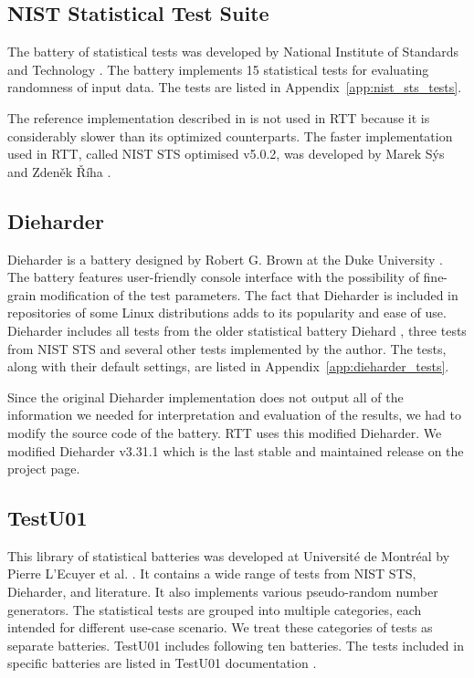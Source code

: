 \documentclass[
	digital,    %
	oneside,
	color,
	11pt,
	nocover,
	notable,
	nolof,
	nolot,
]{fithesis3}
\theoremstyle{definition}
\theoremstyle{remark}
\begin{document}
\subsection{NIST Statistical Test Suite}
The battery of statistical tests was developed by National Institute of Standards and Technology \cite{nist-sts}. The battery implements 15 statistical tests for evaluating randomness of input data. The tests are listed in Appendix~\ref{app:nist_sts_tests}.

The reference implementation described in \cite{nist-sts-documentation} is not used in RTT because it is considerably slower than its optimized counterparts. The faster implementation used in RTT, called NIST STS optimised v5.0.2, was developed by Marek Sýs and Zdeněk Říha \cite{nist-sts-syso-optimization}.

\subsection{Dieharder}
Dieharder is a battery designed by Robert G. Brown at the Duke University \cite{dieharder}. The battery features user-friendly console interface with the possibility of fine-grain modification of the test parameters. The fact that Dieharder is included in repositories of some Linux distributions \cite{dieharder-manpage} adds to its popularity and ease of use. Dieharder includes all tests from the older statistical battery Diehard \cite{diehard}, three tests from NIST STS and several other tests implemented by the author. The tests, along with their default settings, are listed in Appendix~\ref{app:dieharder_tests}.

Since the original Dieharder implementation does not output all of the information we needed for interpretation and evaluation of the results, we had to modify the source code of the battery. RTT uses this modified Dieharder. We modified Dieharder v3.31.1 which is the last stable and maintained release on the project page.

\subsection{TestU01}
This library of statistical batteries was developed at Université de Montréal by Pierre L’Ecuyer et al. \cite{testu01-paper}. It contains a wide range of tests from NIST STS, Dieharder, and literature. It also implements various pseudo-random number generators. The statistical tests are grouped into multiple categories, each intended for different use-case scenario. We treat these categories of tests as separate batteries. TestU01 includes following ten batteries. The tests included in specific batteries are listed in TestU01 documentation \cite{testu01-documentation}.
\end{document}
